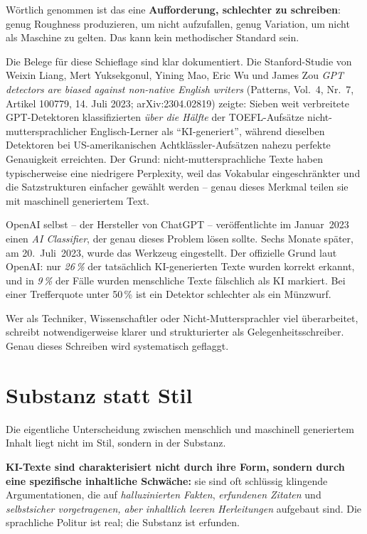 Wörtlich genommen ist das eine \textbf{Aufforderung, schlechter zu
schreiben}: genug Roughness produzieren, um nicht aufzufallen, genug
Variation, um nicht als Maschine zu gelten. Das kann kein
methodischer Standard sein.

Die Belege für diese Schieflage sind klar dokumentiert. Die
Stanford-Studie von Weixin Liang, Mert Yuksekgonul, Yining Mao,
Eric Wu und James Zou \emph{GPT detectors are biased against
non-native English writers} (Patterns, Vol.~4, Nr.~7, Artikel
100779, 14. Juli 2023; arXiv:2304.02819) zeigte: Sieben weit
verbreitete GPT-Detektoren klassifizierten \emph{über die Hälfte}
der TOEFL-Aufsätze nicht-muttersprachlicher Englisch-Lerner als
\enquote{KI-generiert}, während dieselben Detektoren bei
US-amerikanischen Achtklässler-Aufsätzen nahezu perfekte Genauigkeit
erreichten. Der Grund: nicht-muttersprachliche Texte haben
typischerweise eine niedrigere Perplexity, weil das Vokabular
eingeschränkter und die Satzstrukturen einfacher gewählt werden --
genau dieses Merkmal teilen sie mit maschinell generiertem Text.

OpenAI selbst -- der Hersteller von ChatGPT -- veröffentlichte im
Januar~2023 einen \emph{AI Classifier}, der genau dieses Problem
lösen sollte. Sechs Monate später, am 20.~Juli~2023, wurde das
Werkzeug eingestellt. Der offizielle Grund laut OpenAI: nur
\emph{26\,\%} der tatsächlich KI-generierten Texte wurden korrekt
erkannt, und in \emph{9\,\%} der Fälle wurden menschliche Texte
fälschlich als KI markiert. Bei einer Trefferquote unter 50\,\%
ist ein Detektor schlechter als ein Münzwurf.

Wer als Techniker, Wissenschaftler oder Nicht-Muttersprachler viel
überarbeitet, schreibt notwendigerweise klarer und strukturierter
als Gelegenheitsschreiber. Genau dieses Schreiben wird systematisch
geflaggt.

\section{Substanz statt Stil}

Die eigentliche Unterscheidung zwischen menschlich und maschinell
generiertem Inhalt liegt nicht im Stil, sondern in der Substanz.

\textbf{KI-Texte sind charakterisiert nicht durch ihre Form, sondern
durch eine spezifische inhaltliche Schwäche:} sie sind oft
schlüssig klingende Argumentationen, die auf
\emph{halluzinierten Fakten}, \emph{erfundenen Zitaten} und
\emph{selbstsicher vorgetragenen, aber inhaltlich leeren
Herleitungen} aufgebaut sind. Die sprachliche Politur ist real;
die Substanz ist erfunden.


